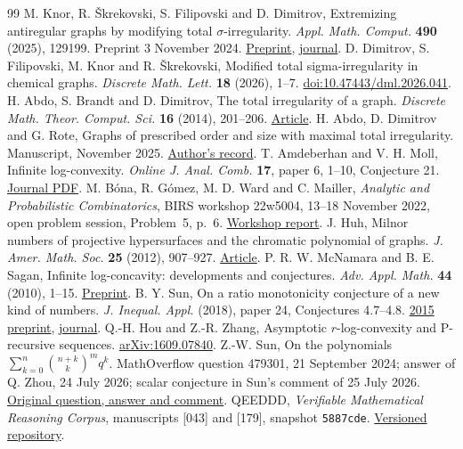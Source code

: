 \documentclass[11pt,a4paper]{article}
\theoremstyle{definition}\newtheorem{problem}[theorem]{Problem}
\begin{document}
\begin{thebibliography}{99}
 M. Knor, R. \v{S}krekovski, S. Filipovski and D. Dimitrov,
Extremizing antiregular graphs by modifying total $\sigma$-irregularity.
\emph{Appl. Math. Comput.} \textbf{490} (2025), 129199.
Preprint 3 November 2024. \href{https://arxiv.org/html/2411.01530v1}{Preprint},
\href{https://doi.org/10.1016/j.amc.2024.129199}{journal}.
 D. Dimitrov, S. Filipovski, M. Knor and R. \v{S}krekovski,
Modified total sigma-irregularity in chemical graphs.
\emph{Discrete Math. Lett.} \textbf{18} (2026), 1--7.
\href{https://doi.org/10.47443/dml.2026.041}{doi:10.47443/dml.2026.041}.
 H. Abdo, S. Brandt and D. Dimitrov, The total irregularity
of a graph. \emph{Discrete Math. Theor. Comput. Sci.} \textbf{16} (2014),
201--206. \href{https://doi.org/10.46298/dmtcs.1263}{Article}.
 H. Abdo, D. Dimitrov and G. Rote, Graphs of prescribed order
and size with maximal total irregularity. Manuscript, November 2025.
\href{https://page.mi.fu-berlin.de/rote/Papers/abstract/Graphs+of+prescribed+order+and+size+with+maximal+total+irregularity.html}{Author's record}.
 T. Amdeberhan and V. H. Moll, Infinite log-convexity.
\emph{Online J. Anal. Comb.} \textbf{17}, paper 6, 1--10, Conjecture 21.
\href{https://combinatorialpress.com/article/ojac/vol17/305.pdf}{Journal PDF}.
 M. B\'ona, R. G\'omez, M. D. Ward and C. Mailler,
\emph{Analytic and Probabilistic Combinatorics}, BIRS workshop 22w5004,
13--18 November 2022, open problem session, Problem~5, p.~6.
\href{https://www.birs.ca/workshops/2022/22w5004/report22w5004.pdf}{Workshop report}.
 J. Huh, Milnor numbers of projective hypersurfaces and
the chromatic polynomial of graphs. \emph{J. Amer. Math. Soc.} \textbf{25}
(2012), 907--927. \href{https://doi.org/10.1090/S0894-0347-2012-00731-0}{Article}.
 P. R. W. McNamara and B. E. Sagan, Infinite log-concavity:
developments and conjectures. \emph{Adv. Appl. Math.} \textbf{44} (2010),
1--15. \href{https://arxiv.org/abs/0808.1065}{Preprint}.
 B. Y. Sun, On a ratio monotonicity conjecture of a new kind
of numbers. \emph{J. Inequal. Appl.} (2018), paper 24, Conjectures 4.7--4.8.
\href{https://arxiv.org/abs/1512.01008}{2015 preprint},
\href{https://doi.org/10.1186/s13660-018-1614-1}{journal}.
 Q.-H. Hou and Z.-R. Zhang, Asymptotic $r$-log-convexity
and P-recursive sequences. \href{https://arxiv.org/abs/1609.07840}{arXiv:1609.07840}.
 Z.-W. Sun, On the polynomials
$\sum_{k=0}^n\binom{n+k}{k}^m q^k$. MathOverflow question 479301,
21 September 2024; answer of Q. Zhou, 24 July 2026; scalar conjecture in
Sun's comment of 25 July 2026.
\href{https://mathoverflow.net/questions/479301/}{Original question, answer and comment}.
 QEEDDD, \emph{Verifiable Mathematical Reasoning Corpus},
manuscripts [043] and [179], snapshot \texttt{5887cde}.
\href{https://github.com/QEEDDD/Verifiable-Mathematical-Reasoning-Corpus/tree/5887cdea4898f0a3aa5bf7a8e0829697bd2b0f4b}{Versioned repository}.
\end{thebibliography}
\end{document}

